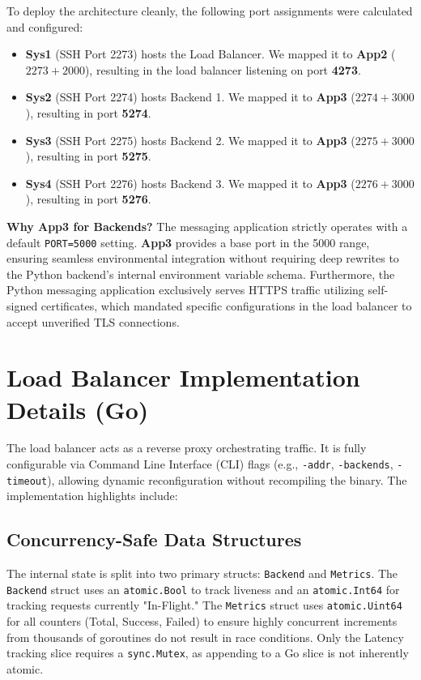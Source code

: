 \documentclass[12pt,a4paper]{article}
\begin{document}
To deploy the architecture cleanly, the following port assignments were calculated and configured:
\begin{itemize}
    \item \textbf{Sys1} (SSH Port 2273) hosts the Load Balancer. We mapped it to \textbf{App2} ($2273 + 2000$), resulting in the load balancer listening on port \textbf{4273}.
    \item \textbf{Sys2} (SSH Port 2274) hosts Backend 1. We mapped it to \textbf{App3} ($2274 + 3000$), resulting in port \textbf{5274}.
    \item \textbf{Sys3} (SSH Port 2275) hosts Backend 2. We mapped it to \textbf{App3} ($2275 + 3000$), resulting in port \textbf{5275}.
    \item \textbf{Sys4} (SSH Port 2276) hosts Backend 3. We mapped it to \textbf{App3} ($2276 + 3000$), resulting in port \textbf{5276}.
\end{itemize}

\textbf{Why App3 for Backends?} The messaging application strictly operates with a default \texttt{PORT=5000} setting. \textbf{App3} provides a base port in the 5000 range, ensuring seamless environmental integration without requiring deep rewrites to the Python backend's internal environment variable schema. Furthermore, the Python messaging application exclusively serves HTTPS traffic utilizing self-signed certificates, which mandated specific configurations in the load balancer to accept unverified TLS connections.

\section{Load Balancer Implementation Details (Go)}
The load balancer acts as a reverse proxy orchestrating traffic. It is fully configurable via Command Line Interface (CLI) flags (e.g., \texttt{-addr}, \texttt{-backends}, \texttt{-timeout}), allowing dynamic reconfiguration without recompiling the binary. The implementation highlights include:

\subsection{Concurrency-Safe Data Structures}
The internal state is split into two primary structs: \texttt{Backend} and \texttt{Metrics}. 
The \texttt{Backend} struct uses an \texttt{atomic.Bool} to track liveness and an \texttt{atomic.Int64} for tracking requests currently "In-Flight." The \texttt{Metrics} struct uses \texttt{atomic.Uint64} for all counters (Total, Success, Failed) to ensure highly concurrent increments from thousands of goroutines do not result in race conditions. Only the Latency tracking slice requires a \texttt{sync.Mutex}, as appending to a Go slice is not inherently atomic.
\end{document}
